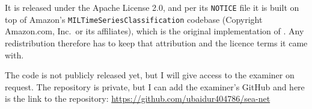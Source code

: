 It is released under the Apache License 2.0, and per its \texttt{NOTICE} file it is built on top of
Amazon's \texttt{MILTimeSeriesClassification} codebase (Copyright Amazon.com, Inc.\ or its
affiliates), which is the original implementation of \millet{} \citep{early2024millet}. Any
redistribution therefore has to keep that attribution and the licence terms it came with.

The code is not publicly released yet, but I will give access to the examiner on request. The repository is private, but I can add the examiner's GitHub and here is the link to the repository: \url{https://github.com/ubaidur404786/sea-net}
